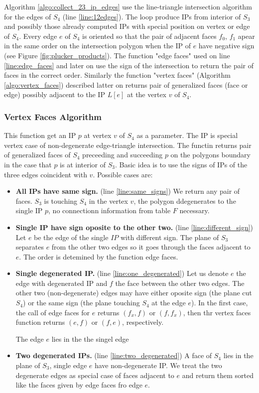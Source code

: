 \documentclass{elsarticle}
\begin{document}
Algorithm \ref{algo:collect_23_ip_edges} use the line-triangle intersection algorithm for the edges of $S_4$ (line \ref{line:12edges}).
The loop produce IPs from interior of $S_3$ and possibly those already computed IPs with special position on vertex or edge of $S_4$. 
Every edge $e$ of $S_4$ is oriented so that the pair of adjacent faces $f_0$, $f_1$ apear in the same order on the intersection polygon when the 
IP of $e$ have negative sign (see Figure \ref{fig:plucker_products}). The function "edge faces" used on line \ref{line:edge_faces} and later on 
use the sign of the intersection to return the pair of faces in the correct order. 
Similarly the function "vertex faces" (Algorithm \ref{algo:vertex_faces}) described latter on
returns pair of generalized faces (face or edge) possibly adjacent to the IP $L[e]$ at the vertex $v$ of $S_4$.



\subsubsection{Vertex Faces Algorithm}
This function get an IP $p$ at vertex $v$ of $S_4$ as a parameter. The IP is special vertex case of non-degenerate edge-triangle intersection. 
The functin returns pair of generalized faces of $S_4$ preceeding and succeeding $p$ on the polygons boundary in the case that $p$ is at interior of $S_3$.
Basic idea is to use the signs of IPs of the three edges coincident with $v$. 
Possible cases are:
\begin{itemize}
 \item {\bf All IPs have same sign.} (line \ref{line:same_signs}) We return any pair of faces.  $S_3$ is touching $S_4$ 
 in the vertex $v$, the polygon ddegenerates to the single IP $p$, no connectionn information from table $F$ necessary.
 \item {\bf Single IP have sign oposite to the other two.} (line \ref{line:different_sign}) Let $e$ be the edge of the single $IP$ with different sign. 
 The plane of $S_3$ separates $e$ from the other two edges so it goes through the faces adjacent to $e$. The order is detemined by the function edge faces.
 \item {\bf Single degenerated IP.} (line \ref{line:one_degenerated}) Let us denote $e$ the edge with degenerated IP and $f$ the face between the other two edges.
 The other two (non-degenerate) edges may have either oposite sign (the plane cut $S_4$) or the same sign (the plane touching $S_4$ at the edge $e$).
 In the first case, the call of edge faces for $e$ returns $(f_x,f)$ or $(f,f_x)$, then thr vertex faces function returns $(e, f)$ or $(f, e)$, respectively.
 
 
 The edge $e$ lies in the the singel edge
 \item {\bf Two degenerated IPs.} (line \ref{line:two_degenerated}) A face of $S_4$ lies in the plane of $S_3$, single edge $e$ have non-degenerate IP.
 We treat the two degenerate edges as special case of faces adjacent to $e$ and return them sorted like the faces given by edge faces fro edge $e$.
\end{itemize}
\end{document}
